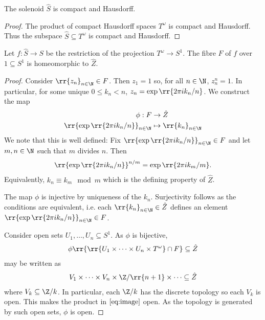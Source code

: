\documentclass{article}
\begin{document}
\begin{claim*}
  The solenoid $\hat S$ is compact and Hausdorff.
  \begin{proof}
    The product of compact Hausdorff spaces $T^\omega$ is compact and Hausdorff.
    Thus the subspace $\hat S\subseteq T^\omega$ is compact and Hausdorff.
  \end{proof}
\end{claim*}

\begin{claim*}
  Let $f:\hat S\to S$ be the restriction of the projection $T^\omega\to S^1$.
  The fibre $F$ of $f$ over $1\subseteq S^1$ is homeomorphic to $\hat Z$.
  \begin{proof}
    Consider $\rr{z_n}_{n\in\N}\in F$. Then $z_1=1$ so, for all $n\in\N$,
    $z_n^n=1$. In particular, for some unique $0\leq k_n<n$, $z_n=\exp\rr{2\pi ik_n/n}$.
    We construct the map
    \begin{align*}
      \phi : F &\to \hat Z\\
      \rr{\exp\rr{2\pi ik_n/n}}_{n\in\N} &\mapsto \rr{k_n}_{n\in\N}
    \end{align*}
    We note that this is well defined: Fix $\rr{\exp\rr{2\pi ik_n/n}}_{n\in\N}\in F$ and
    let $m,n\in\N$ such that $m$ divides $n$. Then
    \begin{align*}
      \rr{\exp\rr{2\pi i k_n/n}}^{n/m} = \exp\rr{2\pi i k_m/m}.
    \end{align*}
    Equivalently, $k_n\equiv k_m\mod m$ which is the defining property of $\hat Z$.

    The map $\phi$ is injective by uniqueness of the $k_n$. Surjectivity follows as
    the conditions are equivalent, i.e. each $\rr{k_n}_{n\in\N}\in\hat Z$ defines an element
    $\rr{\exp\rr{2\pi i k_n/n}}_{n\in\N}\in F$.

    Consider open sets $U_1,\ldots,U_n\subseteq S^1$. As $\phi$ is bijective,
    \begin{align}
      \label{eq:image}
      \phi\rr{\rr{U_1\times\cdots\times U_n\times T^\omega}\cap F} \subseteq \hat Z
    \end{align}
    may be written as
    \begin{align*}
      V_1\times\cdots\times V_n\times \Z/\rr{n+1}\times\cdots\subseteq\hat Z
    \end{align*}
    where $V_k\subseteq \Z/k$. In particular, each $\Z/k$ has the discrete topology so
    each $V_k$ is open. This makes the product in $\ref{eq:image}$ open. As the topology is
    generated by such open sets, $\phi$ is open.


\end{proof}
\end{claim*}
\end{document}
